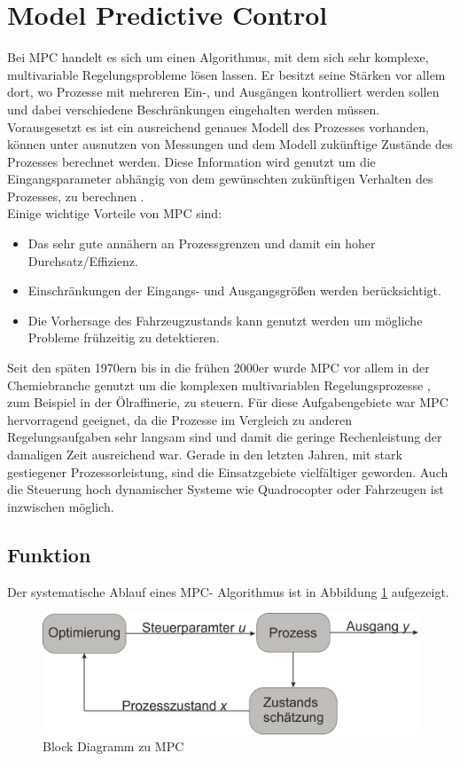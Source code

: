\documentclass{like}
\begin{document}
\section{Model Predictive Control}
Bei \ac{MPC} handelt es sich um einen Algorithmus, mit dem sich sehr komplexe, multivariable Regelungsprobleme lösen lassen. Er besitzt seine Stärken vor allem dort, wo Prozesse mit mehreren Ein-, und Ausgängen kontrolliert werden sollen und dabei verschiedene Beschränkungen eingehalten werden müssen. Vorausgesetzt es ist ein ausreichend genaues Modell des Prozesses vorhanden, können unter ausnutzen von Messungen und dem Modell zukünftige Zustände des Prozesses berechnet werden. Diese Information wird genutzt um die Eingangsparameter abhängig von dem gewünschten zukünftigen Verhalten des Prozesses, zu berechnen \cite{seborg2010process}. \\
Einige wichtige Vorteile von \ac{MPC} sind: 
\begin{itemize}
	\item Das sehr gute annähern an Prozessgrenzen und damit ein hoher Durchsatz/Effizienz.
	\item Einschränkungen der Eingangs- und Ausgangsgrößen werden berücksichtigt.
	\item Die Vorhersage des Fahrzeugzustands kann genutzt werden um mögliche Probleme frühzeitig zu detektieren.
\end{itemize}
Seit den späten 1970ern bis in die frühen 2000er wurde \ac{MPC} vor allem in der Chemiebranche genutzt um die komplexen multivariablen Regelungsprozesse , zum Beispiel in der Ölraffinerie, zu steuern. Für diese Aufgabengebiete war \acl{MPC} hervorragend geeignet, da die Prozesse im Vergleich zu anderen Regelungsaufgaben sehr langsam sind und damit die geringe Rechenleistung der damaligen Zeit ausreichend war. 
Gerade in den letzten Jahren, mit stark gestiegener Prozessorleistung, sind die Einsatzgebiete vielfältiger geworden. Auch die Steuerung hoch dynamischer Systeme wie Quadrocopter \cite{quadcopterMpc} oder Fahrzeugen \cite{carMPC} ist inzwischen möglich. 

\subsection*{Funktion}
Der systematische Ablauf eines \ac{MPC}- Algorithmus ist in Abbildung \ref{fig:mpcBlock} aufgezeigt.  

  \begin{figure}[ht!]
  	\centering
  	\includegraphics[width=350pt]{Abbildungen/mpcBlockDiagram.png}
  	\caption{Block Diagramm zu MPC}
  	\label{fig:mpcBlock}
  \end{figure}
\end{document}
